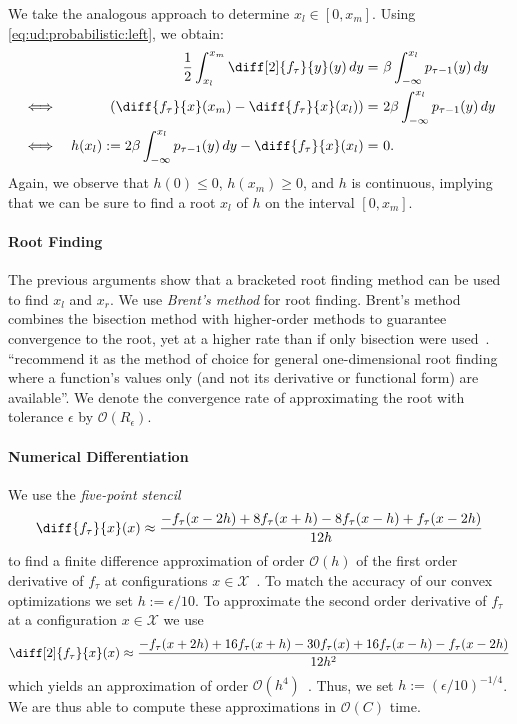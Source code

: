 We take the analogous approach to determine $x_l \in [0,x_m]$. Using \cref{eq:ud:probabilistic:left}, we obtain: \begin{align*}
    && \frac{1}{2} \int_{x_l}^{x_m} \diff[2]{f_{\tau}}{y}(y) \,dy =&\ \beta \int_{-\infty}^{x_l} p_{\tau-1}(y) \,dy \\
    \iff&& \left(\diff{f_{\tau}}{x}(x_m) - \diff{f_{\tau}}{x}(x_l)\right) =&\ 2 \beta \int_{-\infty}^{x_l} p_{\tau-1}(y) \,dy \\
    \iff&& h(x_l) := 2 \beta \int_{-\infty}^{x_l} p_{\tau-1}(y) \,dy - \diff{f_{\tau}}{x}(x_l) =&\ 0.
\end{align*} Again, we observe that $h(0) \leq 0$, $h(x_m) \geq 0$, and $h$ is continuous, implying that we can be sure to find a root $x_l$ of $h$ on the interval $[0,x_m]$.

\paragraph{Root Finding} The previous arguments show that a bracketed root finding method can be used to find $x_l$ and $x_r$. We use \emph{Brent's method} for root finding. Brent's method combines the bisection method with higher-order methods to guarantee convergence to the root, yet at a higher rate than if only bisection were used~\cite{Press2007}. \citeauthor*{Press2007}~\cite{Press2007} ``recommend it as the method of choice for general one-dimensional
root finding where a function’s values only (and not its derivative or functional form)
are available''. We denote the convergence rate of approximating the root with tolerance $\epsilon$ by $\mathcal{O}(R_{\epsilon})$.

\paragraph{Numerical Differentiation} We use the \emph{five-point stencil} \begin{align*}
    \diff{f_{\tau}}{x}(x) \approx \frac{-f_{\tau}(x - 2h) + 8 f_{\tau}(x + h) - 8 f_{\tau}(x - h) + f_{\tau}(x - 2h)}{12h}
\end{align*} to find a finite difference approximation of order $\mathcal{O}(h)$ of the first order derivative of $f_{\tau}$ at configurations $x \in \mathcal{X}$~\cite{Sauer2011}. To match the accuracy of our convex optimizations we set $h := \epsilon / 10$. To approximate the second order derivative of $f_{\tau}$ at a configuration $x \in \mathcal{X}$ we use \begin{align*}
    \diff[2]{f_{\tau}}{x}(x) \approx \frac{-f_{\tau}(x + 2h) + 16 f_{\tau}(x+h) - 30 f_{\tau}(x) + 16 f_{\tau}(x-h) - f_{\tau}(x - 2h)}{12 h^2}
\end{align*} which yields an approximation of order $\mathcal{O}(h^4)$~\cite{Sauer2011}. Thus, we set $h := (\epsilon / 10)^{-1/4}$. We are thus able to compute these approximations in $\mathcal{O}(C)$ time.

